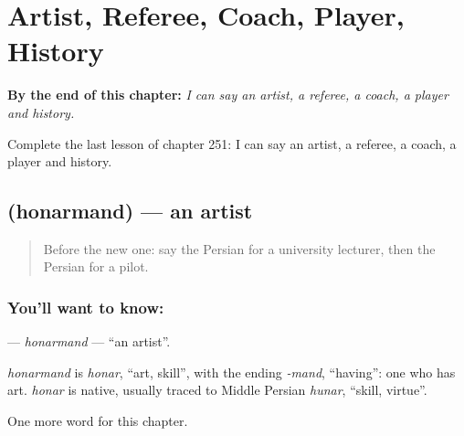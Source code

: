 
\chapter{Artist, Referee, Coach, Player, History}
\label{ch:fa-artist-referee-coach-player-history}

\begin{chapteropening}
\textbf{By the end of this chapter:} \emph{I can say an artist, a referee, a coach, a player and history.}

Complete the last lesson of chapter 251: I can say an artist, a referee, a coach, a player and history.
\end{chapteropening}

\section[\texorpdfstring{\fa{هنرمند} (honarmand)}{هنرمند (honarmand)}]{ (honarmand) — an artist}

\label{lesson:FA-C251-honarmand}



\begin{quote}
Before the new one: say the Persian for a university lecturer, then the Persian for a pilot.
\end{quote}

\subsection*{You'll want to know: }
\textbf{} — \emph{honarmand} — \textquotedblleft{}an artist\textquotedblright{}.

\begin{cousinweb}
\emph{honarmand} is \emph{honar}, \textquotedblleft{}art, skill\textquotedblright{}, with the ending \emph{-mand}, \textquotedblleft{}having\textquotedblright{}: one who has art. \emph{honar} is native, usually traced to Middle Persian \emph{hunar}, \textquotedblleft{}skill, virtue\textquotedblright{}.
\end{cousinweb}

\begin{grammarlens}[title={What you've built}]
One more word for this chapter.
\end{grammarlens}

